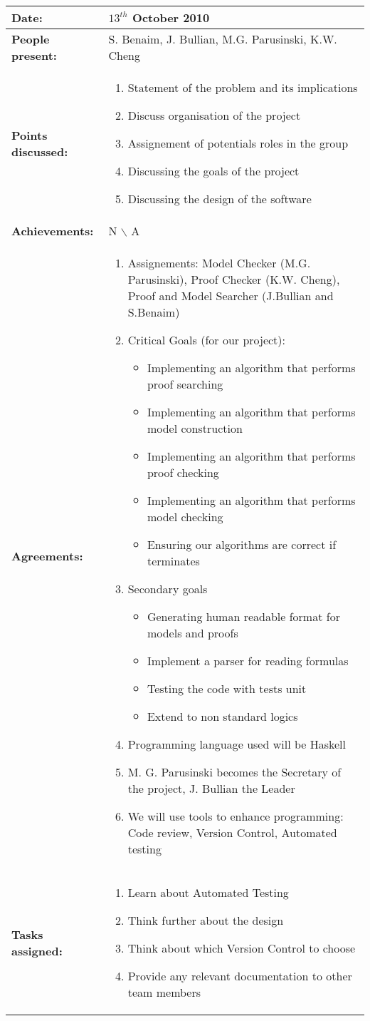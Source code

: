 \documentclass[12pt,a4paper]{article}
\newcommand{\meeting}[6]{%
\begin{center}%
\begin{longtable}{| p{3.5cm} | | p{13cm} |}%
\hline%
\textbf{Date:} & #1 \\%
\hline%
\textbf{People present:} &#2 \\%
\hline%
\textbf{Points discussed:} &#3\\%
\hline%
\textbf{Achievements:} &#4 \\%
\hline%
\textbf{Agreements:} &#5 \\%
\hline%
\textbf{Tasks assigned:} &#6  \\%
\hline%
\end{longtable}%
\end{center}%
\bigbreak
}
\begin{document}
\meeting{$13^{th}$ October 2010}%
{S. Benaim, J. Bullian, M.G. Parusinski, K.W. Cheng}%
{ \begin{enumerate} \item Statement of the problem and its implications 
 \item Discuss organisation of the project 
 \item Assignement of potentials roles in the group
 \item Discussing the goals of the project
 \item Discussing the design of the software 
\end{enumerate} }%
{N $\backslash$ A}
{ \begin{enumerate}
\item Assignements: Model Checker (M.G. Parusinski), Proof Checker (K.W. Cheng),
Proof and Model Searcher (J.Bullian and S.Benaim)
\item Critical Goals (for our project):
\begin{itemize}
\item Implementing an algorithm that performs proof searching
\item Implementing an algorithm that performs model construction
\item Implementing an algorithm that performs proof checking
\item Implementing an algorithm that performs model checking
\item Ensuring our algorithms are correct if terminates
\end{itemize}
\item Secondary goals \begin{itemize}
\item Generating human readable format for models and proofs
\item Implement a parser for reading formulas
\item Testing the code with tests unit
\item Extend to non standard logics
\end{itemize}
\item Programming language used will be Haskell
\item M. G. Parusinski becomes the Secretary of the project, J. Bullian the Leader
\item We will use tools to enhance programming: Code review, Version Control, Automated testing
\end{enumerate} }%
{ \begin{enumerate}\item Learn about Automated Testing
\item Think further about the design
\item Think about which Version Control to choose
\item Provide any relevant documentation to other team members
\end{enumerate}}
\end{document}
